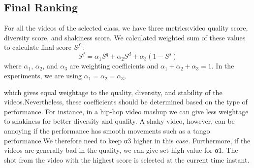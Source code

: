 \documentclass{IEEEtran}
\begin{document}
\subsection{Final Ranking}
For all the videos of the selected class, we have three metrics:video quality score, diversity score, and shakiness score. We calculated weighted sum of these values to calculate final score $S^f$ :
\[
 S^f = \alpha_1S^q+\alpha_2S^d+\alpha_3(1-S^s)
\]
where $\alpha_1$, $\alpha_2$, and $\alpha_3$ are weighting coefficients and $\alpha_1 + \alpha_2 + \alpha_3 = 1.$ In the experiments, we are using $\alpha_1 = \alpha_2 = \alpha_3,$\\

which gives equal weightage to the quality, diversity, and stability of the videos.Nevertheless, these coefficients should be determined based on the type of performance. For instance, in a hip-hop video mashup we can give less weightage to shakiness for better diversity and quality. A shaky video, however, can be annoying if the performance has smooth movements such as a tango performance.We therefore need to keep α3 higher in this case. Furthermore, if the videos are generally bad in the quality, we can give set high value for α1. The shot from the video with the highest score is selected at the current time instant.
\end{document}
